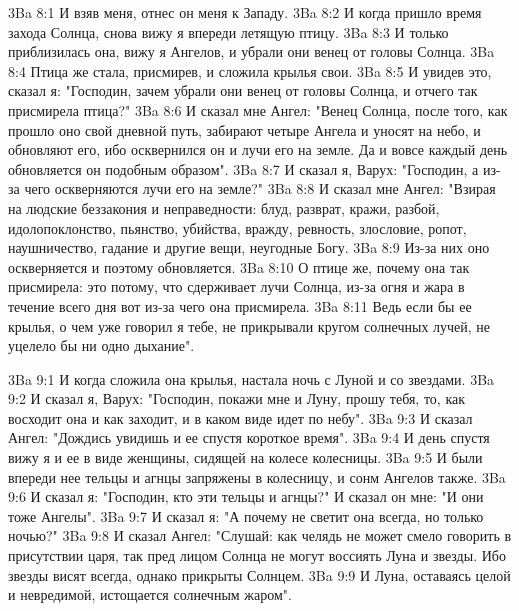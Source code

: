 \vs 3Ba 8:1
И взяв меня, отнес он меня к Западу.
\vs 3Ba 8:2
И когда пришло время захода Солнца, снова вижу я впереди летящую птицу.
\vs 3Ba 8:3
И только приблизилась она, вижу я Ангелов, и убрали они венец от головы Солнца.
\vs 3Ba 8:4
Птица же стала, присмирев, и сложила крылья свои.
\vs 3Ba 8:5
И увидев это, сказал я: "Господин, зачем убрали они венец от головы Солнца, и отчего так присмирела птица?"
\vs 3Ba 8:6
И сказал мне Ангел: "Венец Солнца, после того, как прошло оно свой дневной путь, забирают четыре Ангела и уносят на небо, и обновляют его, ибо осквернился он и лучи его на земле. Да и вовсе каждый день обновляется он подобным образом".
\vs 3Ba 8:7
И сказал я, Варух: "Господин, а из-за чего оскверняются лучи его на земле?"
\vs 3Ba 8:8
И сказал мне Ангел: "Взирая на людские беззакония и неправедности: блуд, разврат, кражи, разбой, идолопоклонство, пьянство, убийства, вражду, ревность, злословие, ропот, наушничество, гадание и другие вещи, неугодные Богу.
\vs 3Ba 8:9
Из-за них оно оскверняется и поэтому обновляется.
\vs 3Ba 8:10
О птице же, почему она так присмирела: это потому, что сдерживает лучи Солнца, из-за огня и жара в течение всего дня вот из-за чего она присмирела.
\vs 3Ba 8:11
Ведь если бы ее крылья, о чем уже говорил я тебе, не прикрывали кругом солнечных лучей, не уцелело бы ни одно дыхание".

\vs 3Ba 9:1
И когда сложила она крылья, настала ночь с Луной и со звездами.
\vs 3Ba 9:2
И сказал я, Варух: "Господин, покажи мне и Луну, прошу тебя, то, как восходит она и как заходит, и в каком виде идет по небу".
\vs 3Ba 9:3
И сказал Ангел: "Дождись увидишь и ее спустя короткое время".
\vs 3Ba 9:4
И день спустя вижу я и ее в виде женщины, сидящей на колесе колесницы.
\vs 3Ba 9:5
И были впереди нее тельцы и агнцы запряжены в колесницу, и сонм Ангелов также.
\vs 3Ba 9:6
И сказал я: "Господин, кто эти тельцы и агнцы?" И сказал он мне: "И они тоже Ангелы".
\vs 3Ba 9:7
И сказал я: "А почему не светит она всегда, но только ночью?"
\vs 3Ba 9:8
И сказал Ангел: "Слушай: как челядь не может смело говорить в присутствии царя, так пред лицом Солнца не могут воссиять Луна и звезды. Ибо звезды висят всегда, однако прикрыты Солнцем.
\vs 3Ba 9:9
И Луна, оставаясь целой и невредимой, истощается солнечным жаром".

